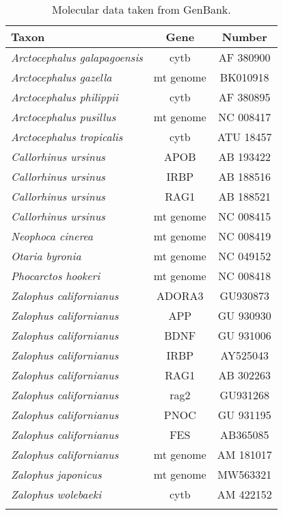 \begin{longtable}{lcc}

\caption{Molecular data taken from GenBank.}\\

\hline
\textbf{Taxon} & \textbf{Gene} & \textbf{Number} \\
\hline
\textit{Arctocephalus galapagoensis}& cytb & AF 380900\\
\textit{Arctocephalus gazella}& mt genome & BK010918\\
\textit{Arctocephalus philippii}& cytb & AF 380895\\
\textit{Arctocephalus pusillus}& mt genome & NC 008417\\
\textit{Arctocephalus tropicalis}& cytb & ATU 18457\\
\textit{Callorhinus ursinus}& APOB & AB 193422\\
\textit{Callorhinus ursinus}& IRBP & AB 188516\\
\textit{Callorhinus ursinus}& RAG1 & AB 188521\\
\textit{Callorhinus ursinus}& mt genome & NC 008415\\
\textit{Neophoca cinerea}& mt genome & NC 008419\\
\textit{Otaria byronia}& mt genome & NC 049152\\
\textit{Phocarctos hookeri}& mt genome & NC 008418\\
\textit{Zalophus californianus}& ADORA3 & GU930873\\
\textit{Zalophus californianus}& APP & GU 930930\\
\textit{Zalophus californianus}& BDNF & GU 931006\\
\textit{Zalophus californianus}& IRBP & AY525043\\
\textit{Zalophus californianus}& RAG1 & AB 302263\\
\textit{Zalophus californianus}& rag2 & GU931268\\
\textit{Zalophus californianus}& PNOC & GU 931195\\
\textit{Zalophus californianus}& FES & AB365085\\
\textit{Zalophus californianus}& mt genome & AM 181017\\
\textit{Zalophus japonicus}& mt genome & MW563321\\
\textit{Zalophus wolebaeki}& cytb & AM 422152\\
\hline

\label{table-genbank}
\end{longtable}

